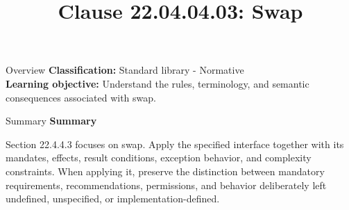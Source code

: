\documentclass[10pt,letterpaper]{article}
\title{Clause 22.04.04.03: Swap}
\author{}
\date{}
\begin{document}
\maketitle
\begin{CornellOverviewBox}{Overview}
\textbf{Classification:} Standard library - Normative\\[2pt]
\textbf{Learning objective:} Understand the rules, terminology, and semantic consequences associated with swap.
\end{CornellOverviewBox}\begin{CornellSummaryBox}{Summary}
{\sffamily\bfseries\color{Accent} Summary}\par\vspace{3pt}Section 22.4.4.3 focuses on swap. Apply the specified interface together with its mandates, effects, result conditions, exception behavior, and complexity constraints. When applying it, preserve the distinction between mandatory requirements, recommendations, permissions, and behavior deliberately left undefined, unspecified, or implementation-defined.
\end{CornellSummaryBox}
\end{document}
